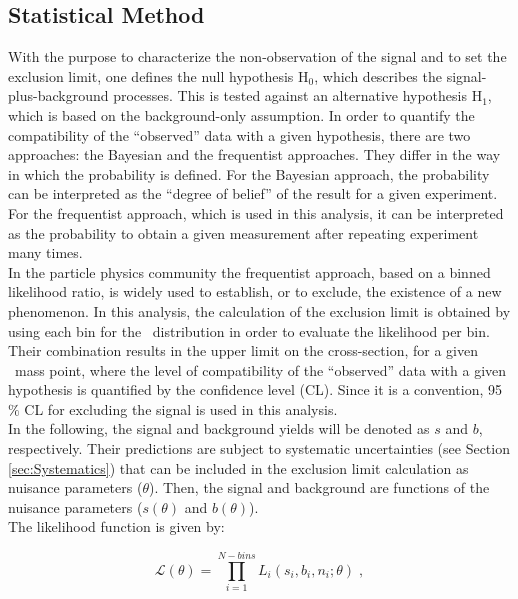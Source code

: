 \subsection{Statistical Method}
\label{subsec:statisticalmethod}

\noindent With the purpose to characterize the non-observation of 
the signal and to set the exclusion limit, one defines the null 
hypothesis H$_{0}$, which describes the signal-plus-background 
processes. This is tested against an alternative hypothesis
H$_{1}$, which is based on the background-only assumption. In order to 
quantify the compatibility of the ``observed'' data with a 
given hypothesis, there are two approaches: the Bayesian 
and the frequentist approaches. They differ in the way in which the 
probability is defined. For the Bayesian approach, the probability can 
be interpreted as the ``degree of belief'' of the result for a given 
experiment. For the frequentist approach, which is used in
this analysis, it can be interpreted as the 
probability to obtain a given measurement after 
repeating experiment many times. \\

\noindent In the particle physics community the frequentist approach, based on a 
binned likelihood ratio, is widely used to establish, or to exclude,
the existence of a new phenomenon. In this analysis, the 
calculation of the exclusion limit is obtained by using each bin for
the \mass~distribution in order to evaluate the likelihood per bin. Their 
combination results in the upper limit on the cross-section, for a given 
\Zprime~mass point, where the level of compatibility of the 
``observed'' data with a given hypothesis is quantified by the 
confidence level (CL). Since it is a convention, 95$\%$ CL for excluding 
the signal is used in this analysis. \\

\noindent In the following, the signal and background yields 
will be denoted as $s$ and $b$, respectively. Their predictions are 
subject to systematic uncertainties (see Section \ref{sec:Systematics}) that 
can be included in the exclusion limit calculation as 
nuisance parameters ($\theta$). Then, the signal and background
are functions of the nuisance parameters ($s(\theta)$ and $b(\theta)$). \\

\noindent The likelihood function is given by:

\begin{equation} \label{eq:likelihood}
 \mathcal{L}(\theta) = \prod_{i=1}^{N-bins}L_{i}(s_{i},b_{i},n_{i};\theta) \; ,
\end{equation}


